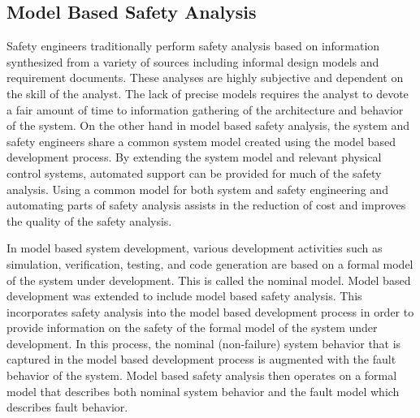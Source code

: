 \subsection{Model Based Safety Analysis}
\label{sec:mbsa}

Safety engineers traditionally perform safety analysis based on information synthesized from a variety of sources including informal design models and requirement documents. These analyses are highly subjective and dependent on the skill of the analyst. The lack of precise models requires the analyst to devote a fair amount of time to information gathering of the architecture and behavior of the system. On the other hand in model based safety analysis, the system and safety engineers share a common system model created using the model based development process. By extending the system model and relevant physical control systems, automated support can be provided for much of the safety analysis. Using a common model for both system and safety engineering and automating parts of safety analysis assists in the reduction of cost and improves the quality of the safety analysis.

In model based system development, various development activities such as simulation, verification, testing, and code generation are based on a formal model of the system under development\cite{Joshi05:Dasc}. This is called the nominal model. Model based development was extended to include model based safety analysis\cite{Joshi05:Dasc,Joshi05:SafeComp,Joshi07:Hase,DBLP:conf/cav/BozzanoCPJKPRT15,CAV2015:BoCiGrMa,info17:HaLuHo}. This incorporates safety analysis into the model based development process in order to provide information on the safety of the formal model of the system under development. In this process, the nominal (non-failure) system behavior that is captured in the model based development process is augmented with the fault behavior of the system. Model based safety analysis then operates on a formal model that describes both nominal system behavior and the fault model which describes fault behavior. 





